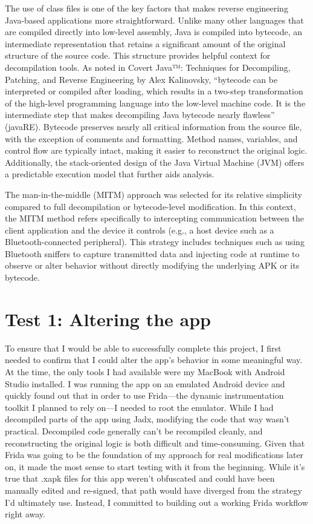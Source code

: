 The use of class files is one of the key factors that makes reverse engineering Java-based applications more straightforward. Unlike many other languages that are compiled directly into low-level assembly, Java is compiled into bytecode, an intermediate representation that retains a significant amount of the original structure of the source code. This structure provides helpful context for decompilation tools.
As noted in Covert Java™: Techniques for Decompiling, Patching, and Reverse Engineering by Alex Kalinovsky, “bytecode can be interpreted or compiled after loading, which results in a two-step transformation of the high-level programming language into the low-level machine code. It is the intermediate step that makes decompiling Java bytecode nearly flawless” (javaRE). Bytecode preserves nearly all critical information from the source file, with the exception of comments and formatting. Method names, variables, and control flow are typically intact, making it easier to reconstruct the original logic. Additionally, the stack-oriented design of the Java Virtual Machine (JVM) offers a predictable execution model that further aids analysis.

The man-in-the-middle (MITM) approach was selected for its relative simplicity compared to full decompilation or bytecode-level modification. In this context, the MITM method refers specifically to intercepting communication between the client application and the device it controls (e.g., a host device such as a Bluetooth-connected peripheral). This strategy includes techniques such as using Bluetooth sniffers to capture transmitted data and injecting code at runtime to observe or alter behavior without directly modifying the underlying APK or its bytecode.


\section{Test 1: Altering the app}
To ensure that I would be able to successfully complete this project, I first needed to confirm that I could alter the app’s behavior in some meaningful way. At the time, the only tools I had available were my MacBook with Android Studio installed. I was running the app on an emulated Android device and quickly found out that in order to use Frida—the dynamic instrumentation toolkit I planned to rely on—I needed to root the emulator. While I had decompiled parts of the app using Jadx, modifying the code that way wasn’t practical. Decompiled code generally can’t be recompiled cleanly, and reconstructing the original logic is both difficult and time-consuming.
Given that Frida was going to be the foundation of my approach for real modifications later on, it made the most sense to start testing with it from the beginning. While it’s true that .xapk files for this app weren’t obfuscated and could have been manually edited and re-signed, that path would have diverged from the strategy I’d ultimately use. Instead, I committed to building out a working Frida workflow right away.

